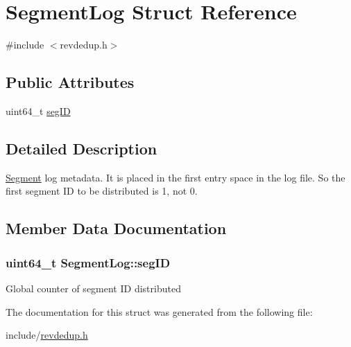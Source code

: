 \hypertarget{structSegmentLog}{\section{\-Segment\-Log \-Struct \-Reference}
\label{structSegmentLog}
}


{\ttfamily \#include $<$revdedup.\-h$>$}

\subsection*{\-Public \-Attributes}
\begin{DoxyCompactItemize}
\item 
uint64\-\_\-t \hyperlink{structSegmentLog_a47c174c1cbcbfc7d6f6eb1e35051b8a1}{seg\-I\-D}
\end{DoxyCompactItemize}


\subsection{\-Detailed \-Description}
\hyperlink{structSegment}{\-Segment} log metadata. \-It is placed in the first entry space in the log file. \-So the first segment \-I\-D to be distributed is 1, not 0. 

\subsection{\-Member \-Data \-Documentation}
\hypertarget{structSegmentLog_a47c174c1cbcbfc7d6f6eb1e35051b8a1}{
\subsubsection[{seg\-I\-D}]{\setlength{\rightskip}{0pt plus 5cm}uint64\-\_\-t {\bf \-Segment\-Log\-::seg\-I\-D}}}\label{structSegmentLog_a47c174c1cbcbfc7d6f6eb1e35051b8a1}
\-Global counter of segment \-I\-D distributed 

\-The documentation for this struct was generated from the following file\-:\begin{DoxyCompactItemize}
\item 
include/\hyperlink{revdedup_8h}{revdedup.\-h}\end{DoxyCompactItemize}
